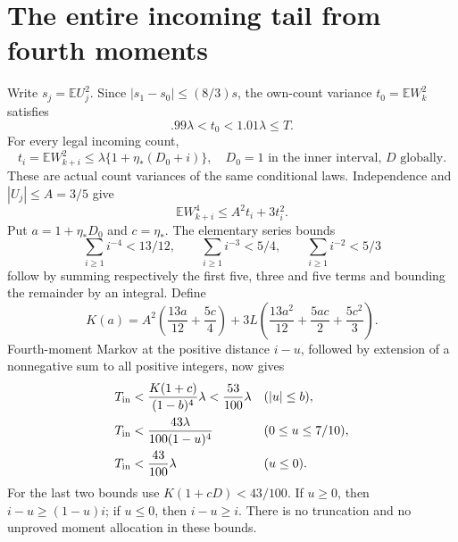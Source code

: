 \documentclass[11pt]{article}
\newcommand{\E}{\mathbb E}\newcommand{\Pp}{\mathbb P}
\begin{document}
\section{The entire incoming tail from fourth moments}
Write $s_j=\E U_j^2$. Since $|s_1-s_0|\le(8/3)s$, the own-count
variance $t_0=\E W_k^2$ satisfies
\[
 .99\lambda<t_0<1.01\lambda\le T.
\]
For every legal incoming count,
\[
 t_i=\E W_{k+i}^2\le\lambda\{1+\eta_*(D_0+i)\},
 \quad D_0=1\text{ in the inner interval, }D\text{ globally}.
\]
These are actual count variances of the same conditional laws.
Independence and $|U_j|\le A=3/5$ give
\[
 \E W_{k+i}^4\le A^2t_i+3t_i^2.
\]
Put $a=1+\eta_*D_0$ and $c=\eta_*$. The elementary series bounds
\[
 \sum_{i\ge1}i^{-4}<13/12,\qquad
 \sum_{i\ge1}i^{-3}<5/4,\qquad
 \sum_{i\ge1}i^{-2}<5/3
\]
follow by summing respectively the first five, three and five terms and
bounding the remainder by an integral. Define
\[
 K(a)=A^2\left(\frac{13a}{12}+\frac{5c}{4}\right)
 +3L\left(\frac{13a^2}{12}+\frac{5ac}{2}+\frac{5c^2}{3}\right).
\]
Fourth-moment Markov at the positive distance $i-u$, followed by extension
of a nonnegative sum to all positive integers, now gives
\begin{align}
 T_{\rm in}&<\frac{K(1+c)}{(1-b)^4}\lambda<\frac{53}{100}\lambda
                         &&(|u|\le b),\label{eq:inner-tail}\\
 T_{\rm in}&<\frac{43\lambda}{100(1-u)^4}
                         &&(0\le u\le7/10),\notag\\
 T_{\rm in}&<\frac{43}{100}\lambda
                         &&(u\le0).
 \label{eq:outer-tail}
\end{align}
For the last two bounds use $K(1+cD)<43/100$. If $u\ge0$, then
$i-u\ge(1-u)i$; if $u\le0$, then $i-u\ge i$.
There is no truncation and no unproved moment allocation in these bounds.
\end{document}
